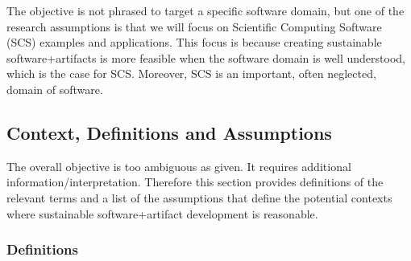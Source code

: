\documentclass[12pt]{article}
\begin{document}
The objective is not phrased to target a specific software domain, but one of
the research assumptions is that we will focus on Scientific Computing Software
(SCS) examples and applications.  This focus is because creating sustainable
software+artifacts is more feasible when the software domain is well understood,
which is the case for SCS.  Moreover, SCS is an important, often neglected,
domain of software.

\subsection*{Context, Definitions and Assumptions}

The overall objective is too ambiguous as given.  It requires additional
information/interpretation.  Therefore this section provides definitions of the
relevant terms and a list of the assumptions that define the potential contexts
where sustainable software+artifact development is reasonable.

\subsubsection*{Definitions}
\end{document}
